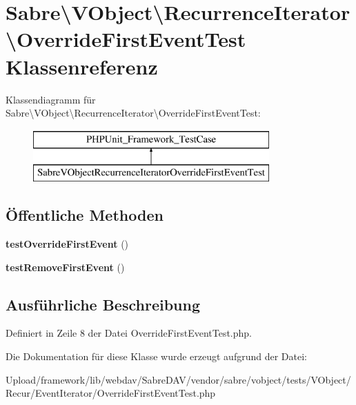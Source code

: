 \hypertarget{class_sabre_1_1_v_object_1_1_recurrence_iterator_1_1_override_first_event_test}{}\section{Sabre\textbackslash{}V\+Object\textbackslash{}Recurrence\+Iterator\textbackslash{}Override\+First\+Event\+Test Klassenreferenz}
\label{class_sabre_1_1_v_object_1_1_recurrence_iterator_1_1_override_first_event_test}
Klassendiagramm für Sabre\textbackslash{}V\+Object\textbackslash{}Recurrence\+Iterator\textbackslash{}Override\+First\+Event\+Test\+:\begin{figure}[H]
\begin{center}
\leavevmode
\includegraphics[height=2.000000cm]{class_sabre_1_1_v_object_1_1_recurrence_iterator_1_1_override_first_event_test}
\end{center}
\end{figure}
\subsection*{Öffentliche Methoden}
\begin{DoxyCompactItemize}
\item 
\mbox{\label{class_sabre_1_1_v_object_1_1_recurrence_iterator_1_1_override_first_event_test_a3401f5ea0f9eb46ae76b627d3e2855f1}} 
{\bfseries test\+Override\+First\+Event} ()
\item 
\mbox{\label{class_sabre_1_1_v_object_1_1_recurrence_iterator_1_1_override_first_event_test_ab13593411f660dfac5d10df1ab490487}} 
{\bfseries test\+Remove\+First\+Event} ()
\end{DoxyCompactItemize}


\subsection{Ausführliche Beschreibung}


Definiert in Zeile 8 der Datei Override\+First\+Event\+Test.\+php.



Die Dokumentation für diese Klasse wurde erzeugt aufgrund der Datei\+:\begin{DoxyCompactItemize}
\item 
Upload/framework/lib/webdav/\+Sabre\+D\+A\+V/vendor/sabre/vobject/tests/\+V\+Object/\+Recur/\+Event\+Iterator/Override\+First\+Event\+Test.\+php\end{DoxyCompactItemize}
